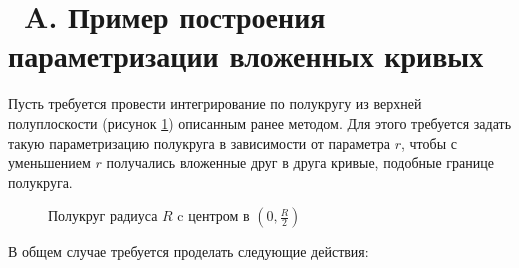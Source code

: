\documentclass[a4paper, 12pt]{article}
\begin{document}
\section*{\appendixname\ A. Пример построения параметризации вложенных кривых}
Пусть требуется провести интегрирование по полукругу из верхней полуплоскости (рисунок \ref{hcircapp}) описанным ранее методом.
Для этого требуется задать такую параметризацию полукруга в зависимости от параметра $r$, чтобы с уменьшением $r$ получались вложенные друг в друга кривые, подобные границе полукруга.
\begin{figure}[h!]
  \noindent{}
  \caption{Полукруг радиуса $R$ c центром в $(0, \frac{R}{2})$}
  \label{hcircapp}
  \end{figure} 
В общем случае требуется проделать следующие действия:
\end{document}
